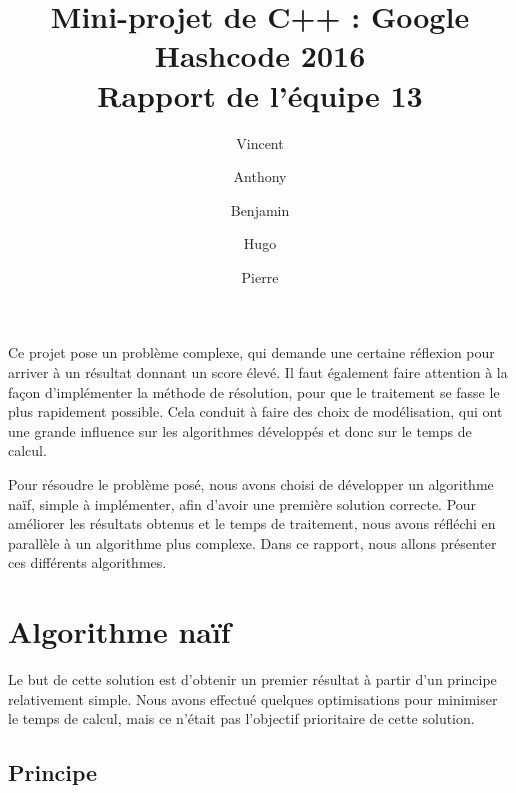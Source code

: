 \documentclass[11pt]{article}
\title{Mini-projet de C++ : Google Hashcode 2016\\Rapport de l'équipe 13}
\author{Vincent \bsc{Cotineau} \and Anthony \bsc{Griffon} \and Benjamin \bsc{Landry} \and Hugo \bsc{Pigeon} \and Pierre \bsc{Pétillon}}
\begin{document}
	\begin{center}
	\noindent{}
	\end{center}
	\let\newpage\relax%
	\maketitle
	
	Ce projet pose un problème complexe, qui demande une certaine réflexion pour arriver à un résultat donnant un score élevé. Il faut également faire attention à la façon d'implémenter la méthode de résolution, pour que le traitement se fasse le plus rapidement possible. Cela conduit à faire des choix de modélisation, qui ont une grande influence sur les algorithmes développés et donc sur le temps de calcul.
	
	Pour résoudre le problème posé, nous avons choisi de développer un algorithme naïf, simple à implémenter, afin d'avoir une première solution correcte. Pour améliorer les résultats obtenus et le temps de traitement, nous avons réfléchi en parallèle à un algorithme plus complexe. Dans ce rapport, nous allons présenter ces différents algorithmes.

	\section{Algorithme naïf}
		
			Le but de cette solution est d'obtenir un premier résultat à partir d'un principe relativement simple. Nous avons effectué quelques optimisations pour minimiser le temps de calcul, mais ce n'était pas l'objectif prioritaire de cette solution.
	
		\subsection{Principe}
			
\end{document}
